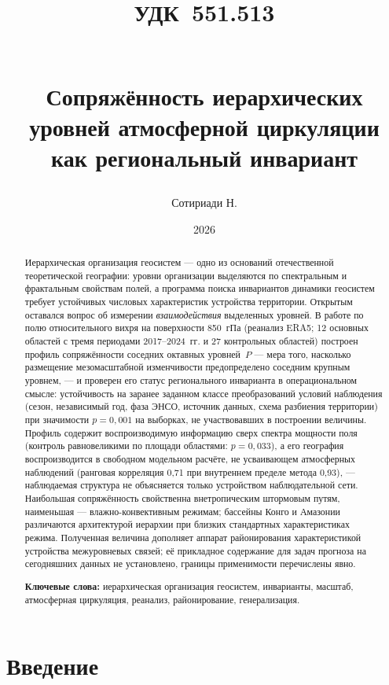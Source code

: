 \documentclass[11pt,a4paper]{article}
\title{{\normalsize\normalfont\hspace*{-\leftskip}\parbox{\linewidth}{\raggedright УДК~551.513}}\\[1.5em]
Сопряжённость иерархических уровней атмосферной циркуляции\\
как региональный инвариант}
\author{Сотириади Н.}
\date{2026}
\begin{document}
\maketitle

\begin{abstract}
Иерархическая организация геосистем --- одно из оснований отечественной теоретической географии: уровни организации выделяются по спектральным и фрактальным свойствам полей, а программа поиска инвариантов динамики геосистем требует устойчивых числовых характеристик устройства территории. Открытым оставался вопрос об измерении \emph{взаимодействия} выделенных уровней. В работе по полю относительного вихря на поверхности 850~гПа (реанализ ERA5; 12 основных областей с тремя периодами 2017--2024~гг. и 27 контрольных областей) построен профиль сопряжённости соседних октавных уровней~$P$ --- мера того, насколько размещение мезомасштабной изменчивости предопределено соседним крупным уровнем, --- и проверен его статус регионального инварианта в операциональном смысле: устойчивость на заранее заданном классе преобразований условий наблюдения (сезон, независимый год, фаза ЭНСО, источник данных, схема разбиения территории) при значимости $p=0{,}001$ на выборках, не участвовавших в построении величины. Профиль содержит воспроизводимую информацию сверх спектра мощности поля (контроль равновеликими по площади областями: $p=0{,}033$), а его география воспроизводится в свободном модельном расчёте, не усваивающем атмосферных наблюдений (ранговая корреляция 0,71 при внутреннем пределе метода 0,93), --- наблюдаемая структура не объясняется только устройством наблюдательной сети. Наибольшая сопряжённость свойственна внетропическим штормовым путям, наименьшая --- влажно-конвективным режимам; бассейны Конго и Амазонии различаются архитектурой иерархии при близких стандартных характеристиках режима. Полученная величина дополняет аппарат районирования характеристикой устройства межуровневых связей; её прикладное содержание для задач прогноза на сегодняшних данных не установлено, границы применимости перечислены явно.

\smallskip
\noindent\textbf{Ключевые слова:} иерархическая организация геосистем, инварианты, масштаб, атмосферная циркуляция, реанализ, районирование, генерализация.
\end{abstract}

\section{Введение}
\label{sec:intro}
\end{document}
